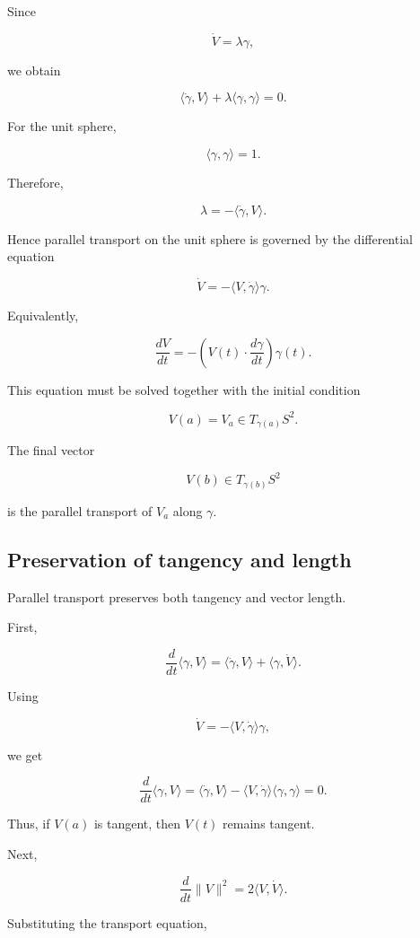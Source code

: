 \documentclass[12pt,a4paper]{article}
\theoremstyle{notespace}
\begin{document}
Since

\[
\dot V=\lambda\gamma,
\]

we obtain

\[
\langle\dot\gamma,V\rangle
+
\lambda\langle\gamma,\gamma\rangle
=
0.
\]

For the unit sphere,

\[
\langle\gamma,\gamma\rangle=1.
\]

Therefore,

\[
\lambda
=
-\langle\dot\gamma,V\rangle.
\]

Hence parallel transport on the unit sphere is governed by the
differential equation

\[
\boxed{
	\dot V
	=
	-\langle V,\dot\gamma\rangle\gamma.
}
\]

Equivalently,

\[
\boxed{
	\frac{dV}{dt}
	=
	-
	\left(
	V(t)\cdot\frac{d\gamma}{dt}
	\right)\gamma(t).
}
\]

This equation must be solved together with the initial condition

\[
V(a)=V_a\in T_{\gamma(a)}S^2.
\]

The final vector

\[
V(b)\in T_{\gamma(b)}S^2
\]

is the parallel transport of \(V_a\) along \(\gamma\).

\subsection{Preservation of tangency and length}

Parallel transport preserves both tangency and vector length.

First,

\[
\frac{d}{dt}\langle\gamma,V\rangle
=
\langle\dot\gamma,V\rangle
+
\langle\gamma,\dot V\rangle.
\]

Using

\[
\dot V
=
-\langle V,\dot\gamma\rangle\gamma,
\]

we get

\[
\frac{d}{dt}\langle\gamma,V\rangle
=
\langle\dot\gamma,V\rangle
-
\langle V,\dot\gamma\rangle
\langle\gamma,\gamma\rangle
=
0.
\]

Thus, if \(V(a)\) is tangent, then \(V(t)\) remains tangent.

Next,

\[
\frac{d}{dt}\|V\|^2
=
2\langle V,\dot V\rangle.
\]

Substituting the transport equation,
\end{document}
